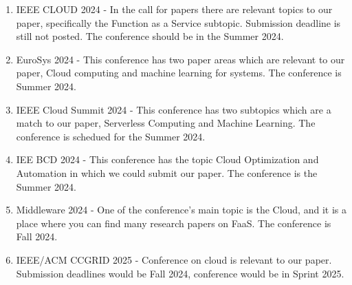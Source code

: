 \documentclass[conference]{IEEEtran}
\begin{document}
\begin{enumerate}
    \item IEEE CLOUD 2024 - In the call for papers there are relevant topics to our paper, specifically the Function as a Service subtopic. Submission deadline is still not posted. The conference should be in the Summer 2024.
    \item EuroSys 2024 - This conference has two paper areas which are relevant to our paper, Cloud computing and machine learning for systems. The conference is Summer 2024.
    \item IEEE Cloud Summit 2024 - This conference has two subtopics which are a match to our paper, Serverless Computing and Machine Learning. The conference is schedued for the Summer 2024.
    \item IEE BCD 2024 - This conference has the topic Cloud Optimization and Automation in which we could submit our paper. The conference is the Summer 2024.
    \item Middleware 2024 - One of the conference's main topic is the Cloud, and it is a place where you can find many research papers on FaaS. The conference is Fall 2024.
    \item IEEE/ACM CCGRID 2025 - Conference on cloud is relevant to our paper. Submission deadlines would be Fall 2024, conference would be in Sprint 2025.
\end{enumerate}



\end{document}
